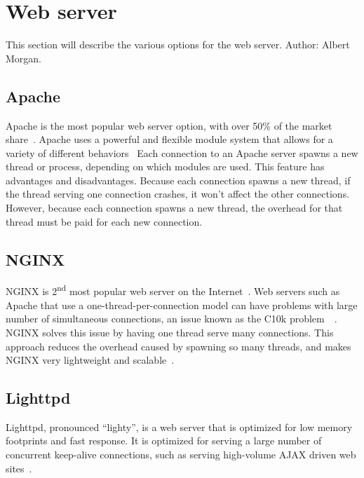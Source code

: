 \documentclass[10pt,draftclsnofoot,onecolumn]{IEEEtran}
\begin{document}
	\section{Web server}
	This section will describe the various options for the web server. Author: Albert Morgan.

	\subsection{Apache}
	Apache is the most popular web server option, with over 50\% of the market share~\cite{apache-usage-statistics}.
	Apache uses a powerful and flexible module system that allows for a variety of different behaviors~\cite{apache-vs-nginx-practical-considerations}
	Each connection to an Apache server spawns a new thread or process, depending on which modules are used.
	This feature has advantages and disadvantages.
	Because each connection spawns a new thread, if the thread serving one connection crashes, it won't affect the other connections.
	However, because each connection spawns a new thread, the overhead for that thread must be paid for each new connection.

	\subsection{NGINX}
	NGINX is 2\textsuperscript{nd} most popular web server on the Internet~\cite{nginx-usage-statistics}.
	Web servers such as Apache that use a one-thread-per-connection model can have problems with large number of simultaneous connections, an issue known as the C10k problem~\cite{apache-vs-nginx-practical-considerations}~\cite{c10k-problem}.
	NGINX solves this issue by having one thread serve many connections.
	This approach reduces the overhead caused by spawning so many threads, and makes NGINX very lightweight and scalable~\cite{nginx-vs-apache-our-view}.
	
	\subsection{Lighttpd}
	Lighttpd, pronounced ``lighty'', is a web server that is optimized for low memory footprints and fast response.
	It is optimized for serving a large number of concurrent keep-alive connections, such as serving high-volume AJAX driven web sites~\cite{lighttpd}.
\end{document}
